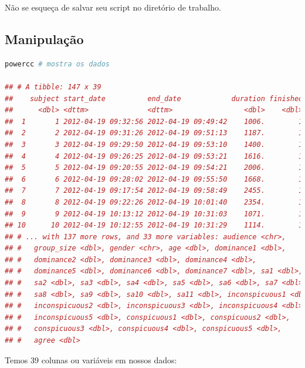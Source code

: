 \documentclass{article}
\begin{document}
Não se esqueça de salvar seu script no diretório de trabalho.

\subsection{Manipulação}

\begin{lstlisting}[language=R]
powercc # mostra os dados

## # A tibble: 147 x 39
##    subject start_date          end_date            duration finished power
##      <dbl> <dttm>              <dttm>                 <dbl>    <dbl> <chr>
##  1       1 2012-04-19 09:32:56 2012-04-19 09:49:42    1006.        1 high 
##  2       2 2012-04-19 09:31:26 2012-04-19 09:51:13    1187.        1 low  
##  3       3 2012-04-19 09:29:50 2012-04-19 09:53:10    1400.        1 low  
##  4       4 2012-04-19 09:26:25 2012-04-19 09:53:21    1616.        1 low  
##  5       5 2012-04-19 09:20:55 2012-04-19 09:54:21    2006.        1 high 
##  6       6 2012-04-19 09:28:02 2012-04-19 09:55:50    1668.        1 high 
##  7       7 2012-04-19 09:17:54 2012-04-19 09:58:49    2455.        1 low  
##  8       8 2012-04-19 09:22:26 2012-04-19 10:01:40    2354.        1 high 
##  9       9 2012-04-19 10:13:12 2012-04-19 10:31:03    1071.        1 low  
## 10      10 2012-04-19 10:12:55 2012-04-19 10:31:29    1114.        1 high 
## # ... with 137 more rows, and 33 more variables: audience <chr>,
## #   group_size <dbl>, gender <chr>, age <dbl>, dominance1 <dbl>,
## #   dominance2 <dbl>, dominance3 <dbl>, dominance4 <dbl>,
## #   dominance5 <dbl>, dominance6 <dbl>, dominance7 <dbl>, sa1 <dbl>,
## #   sa2 <dbl>, sa3 <dbl>, sa4 <dbl>, sa5 <dbl>, sa6 <dbl>, sa7 <dbl>,
## #   sa8 <dbl>, sa9 <dbl>, sa10 <dbl>, sa11 <dbl>, inconspicuous1 <dbl>,
## #   inconspicuous2 <dbl>, inconspicuous3 <dbl>, inconspicuous4 <dbl>,
## #   inconspicuous5 <dbl>, conspicuous1 <dbl>, conspicuous2 <dbl>,
## #   conspicuous3 <dbl>, conspicuous4 <dbl>, conspicuous5 <dbl>,
## #   agree <dbl>

\end{lstlisting}

Temos 39 colunas ou variáveis em nossos dados:
\end{document}
